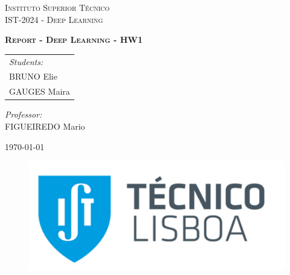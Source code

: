 \begin{titlepage}
   \begin{center}
        \vspace*{1cm}

        \LARGE
        \textsc{Instituto Superior Técnico \\
                 IST-2024 - Deep Learning\\}

        \vspace{2.5cm}
        \huge
        \textbf{\textsc{Report - Deep Learning - HW1}}
    \end{center}
        
    \Large
    \vspace{2.5cm}
    \begin{tabular}{l}
        \emph{Students:}\\
        BRUNO Elie\\
        GAUGES Maira \\
    \end{tabular}

    \begin{flushright}
        \Large
        \vspace{2.5cm}
        \emph{Professor:} \\
        FIGUEIREDO Mario
    \end{flushright}
        
    \begin{center}
        \Large
        \vspace{2.5cm}
        \today
        
        \vfill
        \large

        \begin{figure}[!b]
            \centering
            \includegraphics[scale=0.275]{./images/logo.png}
        \end{figure}
   \end{center}
\end{titlepage}